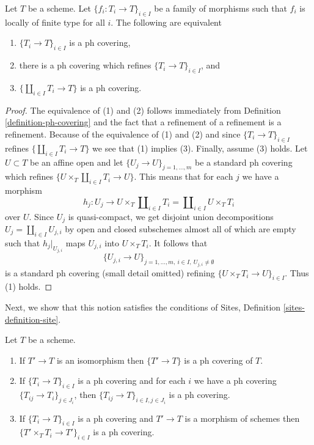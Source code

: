 \begin{lemma}
\label{lemma-refine-by-ph}
Let $T$ be a scheme. Let $\{f_i : T_i \to T\}_{i \in I}$ be a family
of morphisms such that $f_i$ is locally of finite type for all $i$.
The following are equivalent
\begin{enumerate}
\item $\{T_i \to T\}_{i \in I}$ is a ph covering,
\item there is a ph covering which refines $\{T_i \to T\}_{i \in I}$, and
\item $\{\coprod_{i \in I} T_i \to T\}$ is a ph covering.
\end{enumerate}
\end{lemma}

\begin{proof}
The equivalence of (1) and (2) follows immediately from
Definition \ref{definition-ph-covering}
and the fact that a refinement of a refinement is a refinement.
Because of the equivalence of (1) and (2) and since
$\{T_i \to T\}_{i \in I}$ refines $\{\coprod_{i \in I} T_i \to T\}$
we see that (1) implies (3). Finally, assume (3) holds.
Let $U \subset T$ be an affine open and let
$\{U_j \to U\}_{j = 1, \ldots, m}$ be a standard ph covering
which refines $\{U \times_T \coprod_{i \in I} T_i \to U\}$.
This means that for each $j$ we have a morphism
$$
h_j :
U_j
\longrightarrow
U \times_T \coprod\nolimits_{i \in I} T_i =
\coprod\nolimits_{i \in I} U \times_T T_i
$$
over $U$. Since $U_j$ is quasi-compact, we get
disjoint union decompositions $U_j = \coprod_{i \in I} U_{j, i}$
by open and closed subschemes almost all of which are empty
such that $h_j|_{U_{j, i}}$ maps $U_{j, i}$ into $U \times_T T_i$.
It follows that
$$
\{U_{j, i} \to U\}_{j = 1, \ldots, m,\ i \in I,\ U_{j, i} \not = \emptyset}
$$
is a standard ph covering (small detail omitted) refining
$\{U \times_T T_i \to U\}_{i \in I}$. Thus (1) holds.
\end{proof}

\noindent
Next, we show that this notion satisfies the conditions of
Sites, Definition \ref{sites-definition-site}.

\begin{lemma}
\label{lemma-ph}
Let $T$ be a scheme.
\begin{enumerate}
\item If $T' \to T$ is an isomorphism then $\{T' \to T\}$
is a ph covering of $T$.
\item If $\{T_i \to T\}_{i\in I}$ is a ph covering and for each
$i$ we have a ph covering $\{T_{ij} \to T_i\}_{j\in J_i}$, then
$\{T_{ij} \to T\}_{i \in I, j\in J_i}$ is a ph covering.
\item If $\{T_i \to T\}_{i\in I}$ is a ph covering
and $T' \to T$ is a morphism of schemes then
$\{T' \times_T T_i \to T'\}_{i\in I}$ is a ph covering.
\end{enumerate}
\end{lemma}

